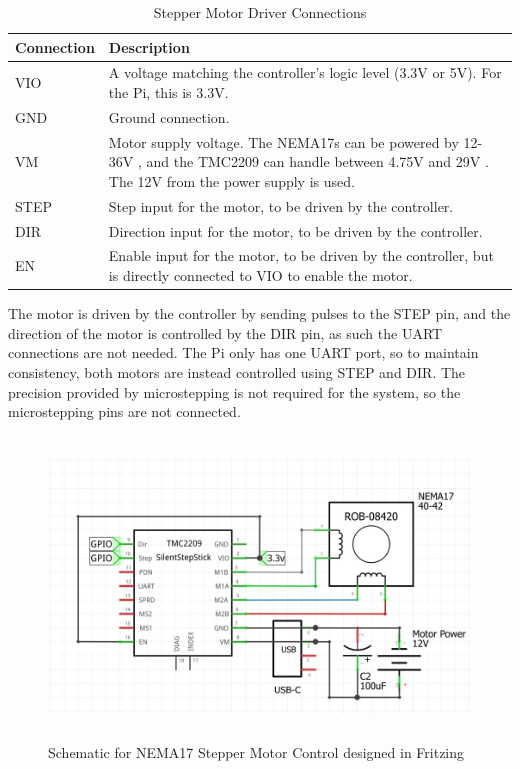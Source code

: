 \begin{table}[H]
    \centering
    {\fontsize{10pt}{12pt}\selectfont
    \begin{tabularx}{\textwidth}{|p{3cm}|X|}
        \hline
        \textbf{Connection} & \textbf{Description} \\
        \hline
        VIO & A voltage matching the controller's logic level (3.3V or 5V). For the Pi, this is 3.3V. \\
        \hline
        GND & Ground connection. \\
        \hline
        VM & Motor supply voltage. The NEMA17s can be powered by 12-36V \cite{nema17}, and the TMC2209 can handle between 4.75V and 29V \cite{tmc2209}. The 12V from the power supply is used. \\
        \hline
        STEP & Step input for the motor, to be driven by the controller. \\
        \hline
        DIR & Direction input for the motor, to be driven by the controller. \\
        \hline
        EN & Enable input for the motor, to be driven by the controller, but is directly connected to VIO to enable the motor. \\
        \hline
    \end{tabularx}
    }
    \caption{Stepper Motor Driver Connections}
    \label{tab:stepper-motor-driver-connections}
\end{table}

The motor is driven by the controller by sending pulses to the STEP pin, and the direction of the motor is controlled by the DIR pin, as such the UART connections are not needed. The Pi only has one UART port, so to maintain consistency, both motors are instead controlled using STEP and DIR. The precision provided by microstepping is not required for the system, so the microstepping pins are not connected.

\begin{figure}[H]
    \hfill
    \begin{minipage}[t]{\textwidth}
      \centering
      \includegraphics[width=\textwidth,height=8cm, keepaspectratio]{imgs/diagrams/tmc2209wiring.jpg}
      \caption{Schematic for NEMA17 Stepper Motor Control designed in Fritzing \cite{fritzing}}
    \end{minipage}
\end{figure}

